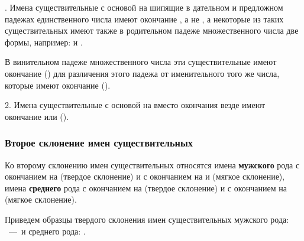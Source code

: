 \documentclass[11pt,a4paper,oneside]{memoir}
\newcommand{\mockitem}[1]{{\mock{#1}}}
\begin{document}
    . Имена существительные с основой на шипящие в дательном и предложном падежах единственного числа имеют окончание {}, а не {}, а некоторые из таких существительных имеют также в родительном падеже множественного числа две формы, например: {} и {}.
    
    В винительном падеже множественного числа эти существительные имеют окончание {} ({}) для различения этого падежа от именительного того же числа, которые имеют окончание {} ({}).
    
    2. Имена существительные с основой на {} вместо окончания {} везде имеют окончание {} или {} ({}).

                \subsubsection{Второе склонение имен существительных}

    Ко второму склонению имен существительных относятся имена \textbf{мужского} рода с окончанием на {} (твердое склонение) и с окончанием на {} и {} (мягкое склонение), имена \textbf{среднего} рода с окончанием на {} (твердое склонение) и с окончанием на {} (мягкое склонение).
    
    \bigskip\mockitem{1. Твердое склонение}
    \medskip
    
    Приведем образцы твердого склонения имен существительных мужского рода: {}~---~и среднего рода: {}.
    
\end{document}

